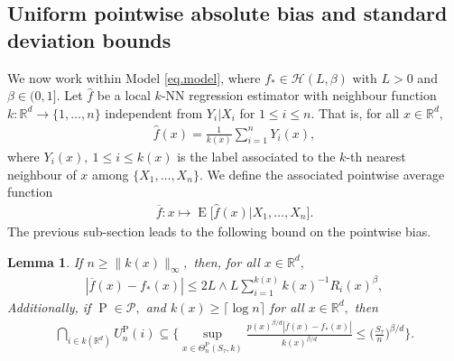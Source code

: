 \documentclass[10pt]{article}
\newcommand{\mH}{\mathcal{H}}
\newcommand{\mP}{\mathcal{P}}
\newcommand{\RR}{\mathbb{R}}
\newcommand{\E}{\operatorname{E}}
\renewcommand{\P}{\operatorname{P}}
\newcommand{\wh}{\widehat}
\newcommand{\ol}{\overline}
\newtheorem{lemma}[theorem]{Lemma}
\begin{document}
\subsection{Uniform pointwise absolute bias and standard deviation bounds}
We now work within Model \eqref{eq.model}, where $f_* \in \mH(L, \beta)$ with $L >0$ and $\beta \in (0, 1].$ Let $\wh f$ be a local $k$-NN regression estimator with neighbour function $k \colon \RR^d \to \{1, \dots, n\}$ independent from $Y_i|X_i$ for $1 \leq i \leq n.$ That is, for all $x \in \RR^d,$
\begin{align}
    \label{eq.local.knn}
    \wh f(x) = \frac{1}{k(x)}\sum_{i=1}^n Y_i(x),
\end{align}
where $Y_i(x), \ 1\leq i \leq k(x)$ is the label associated to the $k$-th nearest neighbour of $x$ among $\{X_1, \dots, X_n\}.$ We define the associated pointwise average function 
\begin{align}
    \label{eq.average.knn}
    \ol f\colon x \mapsto \E\big[\wh f(x)|X_1, \dots, X_n\big].
\end{align}
The previous sub-section leads to the following bound on the pointwise bias.
\begin{lemma}
    \label{lem.bias.term}
    If $n \geq \|k(x)\|_{\infty},$ then, for all $x \in \RR^d,$
        \begin{align*}
            |\ol f(x) - f_*(x)| \leq 2L \wedge L \sum_{i=1}^{k(x)} k(x)^{-1} R_i(x)^\beta,
        \end{align*}
        Additionally, if $\P \in \mP,$ and $k(x) \geq \lceil \log n\rceil$ for all $x \in \RR^d,$ then
        \begin{align*}
            \bigcap_{i\in k(\RR^d)}U_n^{\P}(i) \subseteq \Bigg\{\sup_{x \in \Theta_n^{\P}(S_\tau, k)}\frac{p(x)^{\beta/d}|\ol f(x) - f_*(x)|}{k(x)^{\beta/d}} \leq \bigg(\frac{S_\tau}{ n}\bigg)^{\beta/d}\Bigg\}.
        \end{align*}
\end{lemma}
\end{document}
